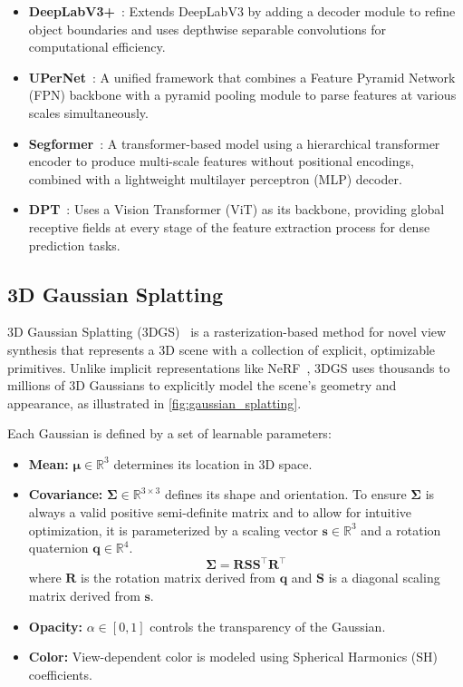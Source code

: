 \begin{itemize}
	\item \textbf{DeepLabV3+}~\cite{chen_encoder-decoder_2018}: Extends DeepLabV3 by adding a decoder module to refine object boundaries and uses depthwise separable convolutions for computational efficiency.

	\item \textbf{UPerNet}~\cite{xiao_unified_2018}: A unified framework that combines a Feature Pyramid Network (FPN) backbone with a pyramid pooling module to parse features at various scales simultaneously.

	\item \textbf{Segformer}~\cite{xie_segformer_2021}: A transformer-based model using a hierarchical transformer encoder to produce multi-scale features without positional encodings, combined with a lightweight multilayer perceptron (MLP) decoder.

	\item \textbf{DPT}~\cite{ranftl_vision_2021}: Uses a Vision Transformer (ViT) as its backbone, providing global receptive fields at every stage of the feature extraction process for dense prediction tasks.
\end{itemize}

\subsection{3D Gaussian Splatting}
3D Gaussian Splatting (3DGS)~\cite{kerbl_3d_2023} is a rasterization-based method for novel view synthesis that represents a 3D scene with a collection of explicit, optimizable primitives. Unlike implicit representations like NeRF~\cite{mildenhall_nerf_2021}, 3DGS uses thousands to millions of 3D Gaussians to explicitly model the scene's geometry and appearance, as illustrated in \cref{fig:gaussian_splatting}.

Each Gaussian is defined by a set of learnable parameters:
\begin{itemize}
	\item \textbf{Mean:} $\boldsymbol{\mu} \in \mathbb{R}^3$ determines its location in 3D space.
	\item \textbf{Covariance:} $\boldsymbol{\Sigma} \in \mathbb{R}^{3 \times 3}$ defines its shape and orientation. To ensure $\boldsymbol{\Sigma}$ is always a valid positive semi-definite matrix and to allow for intuitive optimization, it is parameterized by a scaling vector $\mathbf{s} \in \mathbb{R}^3$ and a rotation quaternion $\mathbf{q} \in \mathbb{R}^4$.
	      \begin{equation}
		      \boldsymbol{\Sigma} = \mathbf{R} \mathbf{S} \mathbf{S}^\top \mathbf{R}^\top
	      \end{equation}
	      where $\mathbf{R}$ is the rotation matrix derived from $\mathbf{q}$ and $\mathbf{S}$ is a diagonal scaling matrix derived from $\mathbf{s}$.
	\item \textbf{Opacity:} $\alpha \in [0, 1]$ controls the transparency of the Gaussian.
	\item \textbf{Color:} View-dependent color is modeled using Spherical Harmonics (SH) coefficients.
\end{itemize}

